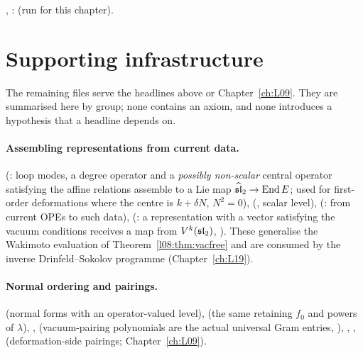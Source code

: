 \begin{status}
\allowbreak{}\allowbreak{}\allowbreak{}\allowbreak{}\allowbreak{}\allowbreak{}, \allowbreak{}\allowbreak{}\allowbreak{}:
\lean{[propext, Classical.}\allowbreak{}\allowbreak\lean{sound]} (run for this chapter).
\end{status}

\section{Supporting infrastructure}\label{l08:sec:infrastructure}

The remaining files serve the headlines above or Chapter~\ref{ch:L09}. They are summarised here by
group; none contains an axiom, and none introduces a hypothesis that a headline depends on.

\paragraph{Assembling representations from current data.}
 (: loop modes, a degree
operator and a \emph{possibly non-scalar} central operator satisfying the affine relations assemble to a
Lie map $\widehat{\mathfrak{sl}}_2\to\operatorname{End} E$; used for first-order deformations where the centre is $k+\delta N$, $N^2=0$),
 (, scalar level),
 (: from current OPEs to such data),
 (: a representation with a vector
satisfying the vacuum conditions receives a map from $V^k(\mathfrak{sl}_2)$, \allowbreak{}).
These generalise the Wakimoto evaluation of Theorem~\ref{l08:thm:vacfree} and are consumed by the
inverse Drinfeld--Sokolov programme (Chapter~\ref{ch:L19}).

\paragraph{Normal ordering and pairings.}
 (normal forms with an operator-valued level),
 (the same retaining $f_0$ and powers of $\lambda$),
,  (vacuum-pairing polynomials
are the actual universal Gram entries, \allowbreak{}),
, ,
 (deformation-side pairings; Chapter~\ref{ch:L09}).

